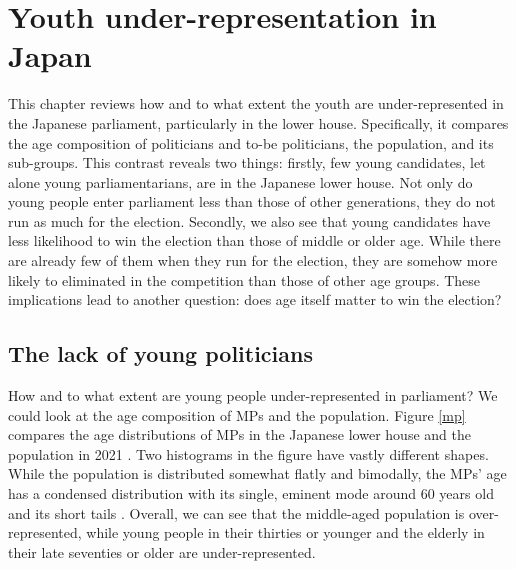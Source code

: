 \documentclass[a4paper, 12pt]{article}\usepackage[dvipdfmx]{graphicx}\usepackage[]{xcolor}
\begin{document}
\section{Youth under-representation in Japan} \label{ch2}

This chapter reviews how and to what extent the youth are under-represented in the Japanese parliament, particularly in the lower house. Specifically, it compares the age composition of politicians and to-be politicians, the population, and its sub-groups. This contrast reveals two things: firstly, few young candidates, let alone young parliamentarians, are in the Japanese lower house. Not only do young people enter parliament less than those of other generations, they do not run as much for the election. Secondly, we also see that young candidates have less likelihood to win the election than those of middle or older age. While there are already few of them when they run for the election, they are somehow more likely to eliminated in the competition than those of other age groups. These implications lead to another question: does age itself matter to win the election?

\subsection{The lack of young politicians} \label{ch2.1}

How and to what extent are young people under-represented in parliament? We could look at the age composition of MPs and the population. Figure \ref{mp} compares the age distributions of MPs in the Japanese lower house and the population in 2021 \footnotemark{}. Two histograms in the figure have vastly different shapes. While the population is distributed somewhat flatly and bimodally, the MPs' age has a condensed distribution with its single, eminent mode around 60 years old and its short tails \footnotemark{}. Overall, we can see that the middle-aged population is over-represented, while young people in their thirties or younger and the elderly in their late seventies or older are under-represented. 

\end{document}
